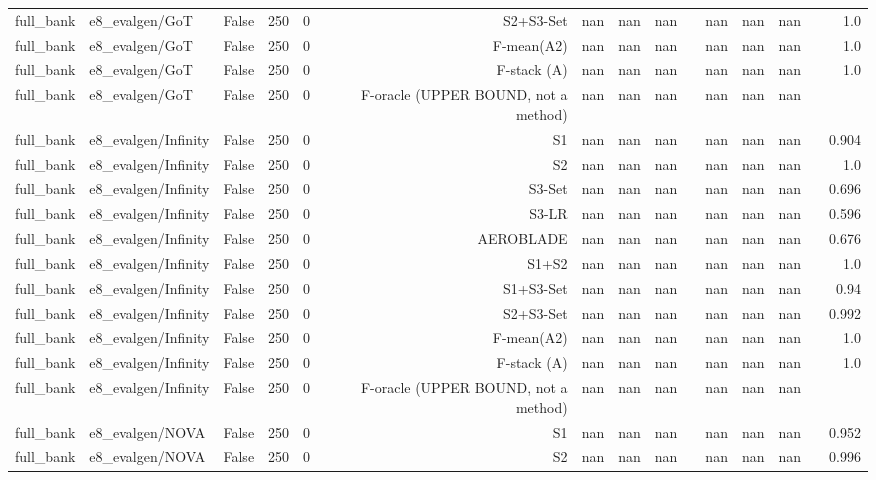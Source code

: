 \begin{table}[htbp]
\begin{tabular}{llrrrrrrrrrrrrr}
full\_bank & e8\_evalgen/GoT & False & 250 & 0 & S2+S3-Set & nan & nan & nan &  & nan & nan & nan &  & 1.0 \\
full\_bank & e8\_evalgen/GoT & False & 250 & 0 & F-mean(A2) & nan & nan & nan &  & nan & nan & nan &  & 1.0 \\
full\_bank & e8\_evalgen/GoT & False & 250 & 0 & F-stack (A) & nan & nan & nan &  & nan & nan & nan &  & 1.0 \\
full\_bank & e8\_evalgen/GoT & False & 250 & 0 & F-oracle (UPPER BOUND, not a method) & nan & nan & nan &  & nan & nan & nan &  &  \\
full\_bank & e8\_evalgen/Infinity & False & 250 & 0 & S1 & nan & nan & nan &  & nan & nan & nan &  & 0.904 \\
full\_bank & e8\_evalgen/Infinity & False & 250 & 0 & S2 & nan & nan & nan &  & nan & nan & nan &  & 1.0 \\
full\_bank & e8\_evalgen/Infinity & False & 250 & 0 & S3-Set & nan & nan & nan &  & nan & nan & nan &  & 0.696 \\
full\_bank & e8\_evalgen/Infinity & False & 250 & 0 & S3-LR & nan & nan & nan &  & nan & nan & nan &  & 0.596 \\
full\_bank & e8\_evalgen/Infinity & False & 250 & 0 & AEROBLADE & nan & nan & nan &  & nan & nan & nan &  & 0.676 \\
full\_bank & e8\_evalgen/Infinity & False & 250 & 0 & S1+S2 & nan & nan & nan &  & nan & nan & nan &  & 1.0 \\
full\_bank & e8\_evalgen/Infinity & False & 250 & 0 & S1+S3-Set & nan & nan & nan &  & nan & nan & nan &  & 0.94 \\
full\_bank & e8\_evalgen/Infinity & False & 250 & 0 & S2+S3-Set & nan & nan & nan &  & nan & nan & nan &  & 0.992 \\
full\_bank & e8\_evalgen/Infinity & False & 250 & 0 & F-mean(A2) & nan & nan & nan &  & nan & nan & nan &  & 1.0 \\
full\_bank & e8\_evalgen/Infinity & False & 250 & 0 & F-stack (A) & nan & nan & nan &  & nan & nan & nan &  & 1.0 \\
full\_bank & e8\_evalgen/Infinity & False & 250 & 0 & F-oracle (UPPER BOUND, not a method) & nan & nan & nan &  & nan & nan & nan &  &  \\
full\_bank & e8\_evalgen/NOVA & False & 250 & 0 & S1 & nan & nan & nan &  & nan & nan & nan &  & 0.952 \\
full\_bank & e8\_evalgen/NOVA & False & 250 & 0 & S2 & nan & nan & nan &  & nan & nan & nan &  & 0.996 \\

\end{tabular}
\end{table}

